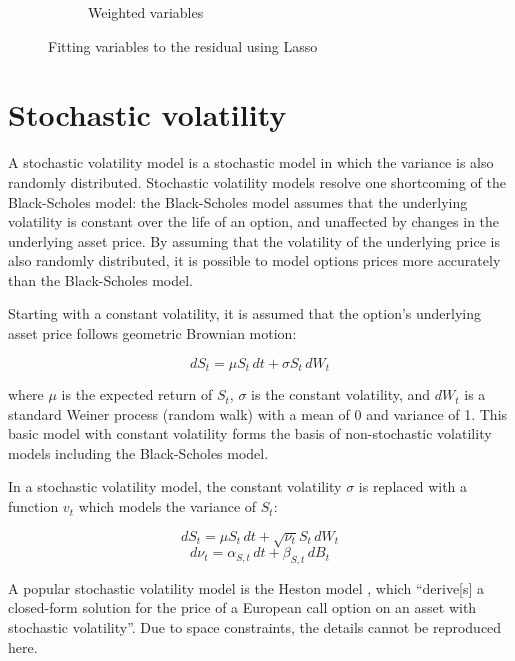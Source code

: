 \documentclass[12pt]{article}
\begin{document}
\begin{figure}
\begin{subfigure}[b]{0.45\textwidth}
      \caption{Weighted variables}
      \label{fig:weighted_variables}
    \end{subfigure}
    \caption{Fitting variables to the residual using Lasso}
  \end{figure}

  \section{Stochastic volatility}

  A stochastic volatility model is a stochastic model in which the variance is also randomly distributed. Stochastic volatility models resolve one shortcoming of the Black-Scholes model: the Black-Scholes model assumes that the underlying volatility is constant over the life of an option, and unaffected by changes in the underlying asset price. By assuming that the volatility of the underlying price is also randomly distributed, it is possible to model options prices more accurately than the Black-Scholes model.

  Starting with a constant volatility, it is assumed that the option's underlying asset price follows geometric Brownian motion:

  \begin{equation}
    dS_t = \mu S_t\,dt + \sigma S_t\,dW_t
  \end{equation}

  where $\mu$ is the expected return of $S_t$, $\sigma$ is the constant volatility, and $dW_t$ is a standard Weiner process (random walk) with a mean of 0 and variance of 1. This basic model with constant volatility forms the basis of non-stochastic volatility models including the Black-Scholes model.

  In a stochastic volatility model, the constant volatility $\sigma$ is replaced with a function $v_t$ which models the variance of $S_t$:

  \begin{equation}
    dS_t = \mu S_t\,dt + \sqrt{\nu_t} S_t\,dW_t
  \end{equation}
  \begin{equation}
    d\nu_t = \alpha_{S,t}\,dt + \beta_{S,t}\,dB_t
  \end{equation}

  A popular stochastic volatility model is the Heston model \cite{Heston1993}, which ``derive[s] a closed-form solution for the price of a European call option on an asset with stochastic volatility''. Due to space constraints, the details cannot be reproduced here.

  \printbibliography
\end{document}
